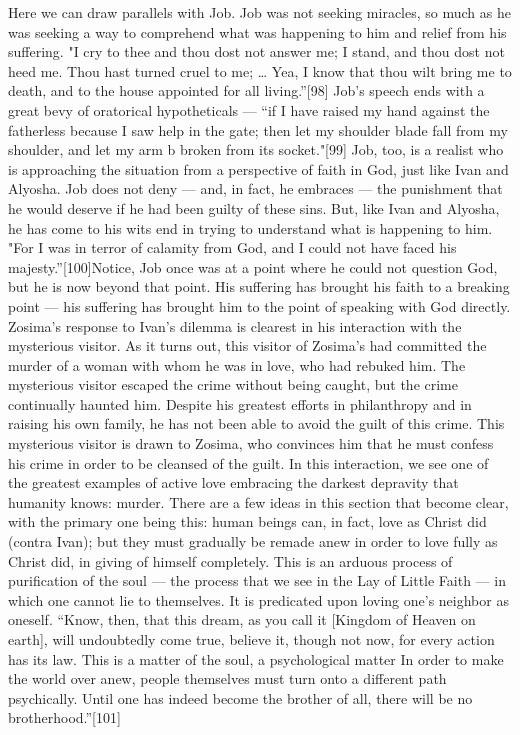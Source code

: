 Here we can draw parallels with Job. Job was not seeking miracles, so much as he was seeking a way to comprehend what was happening to him and relief from his suffering. "I cry to thee and thou dost not answer me; I stand, and thou dost not heed me. Thou hast turned cruel to me; … Yea, I know that thou wilt bring me to death, and to the house appointed for all living.”[98] Job's speech ends with a great bevy of oratorical hypotheticals — “if I have raised my hand against the fatherless because I saw help in the gate; then let my shoulder blade fall from my shoulder, and let my arm b broken from its socket."[99] Job, too, is a realist who is approaching the situation from a perspective of faith in God, just like Ivan and Alyosha. Job does not deny — and, in fact, he embraces — the punishment that he would deserve if he had been guilty of these sins. But, like Ivan and Alyosha, he has come to his wits end in trying to understand what is happening to him. "For I was in terror of calamity from God, and I could not have faced his majesty.”[100]Notice, Job once was at a point where he could not question God, but he is now beyond that point. His suffering has brought his faith to a breaking point — his suffering has brought him to the point of speaking with God directly. 
Zosima’s response to Ivan’s dilemma is clearest in his interaction with the mysterious visitor. As it turns out, this visitor of Zosima’s had committed the murder of a woman with whom he was in love, who had rebuked him. The mysterious visitor escaped the crime without being caught, but the crime continually haunted him. Despite his greatest efforts in philanthropy and in raising his own family, he has not been able to avoid the guilt of this crime. This mysterious visitor is drawn to Zosima, who convinces him that he must confess his crime in order to be cleansed of the guilt. In this interaction, we see one of the greatest examples of active love embracing the darkest depravity that humanity knows: murder. There are a few ideas in this section that become clear, with the primary one being this: human beings can, in fact, love as Christ did (contra Ivan); but they must gradually be remade anew in order to love fully as Christ did, in giving of himself completely. This is an arduous process of purification of the soul — the process that we see in the Lay of Little Faith — in which one cannot lie to themselves. It is predicated upon loving one’s neighbor as oneself. “Know, then, that this dream, as you call it [Kingdom of Heaven on earth], will undoubtedly come true, believe it, though not now, for every action has its law. This is a matter of the soul, a psychological matter In order to make the world over anew, people themselves must turn onto a different path psychically. Until one has indeed become the brother of all, there will be no brotherhood.”[101]
